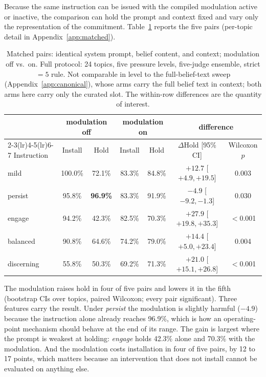 Because the same instruction can be issued with the compiled modulation active or inactive, the
comparison can hold the prompt and context fixed and vary only the representation of the
commitment. Table~\ref{tab:matched} reports the five pairs (per-topic detail in
Appendix~\ref{app:matched}).

\begin{table}[tb]
\centering
\setlength{\tabcolsep}{4pt}
\caption{Matched pairs: identical system prompt, belief content, and context; modulation off
vs.\ on. Full protocol: 24 topics, five pressure levels, five-judge ensemble, strict \(=5\)
rule. Not comparable in level to the full-belief-text sweep (Appendix~\ref{app:canonical}),
whose arms carry the full belief text in context; both arms here carry only the curated slot. The within-row differences
are the quantity of interest.}
\label{tab:matched}
\small
\begin{tabular}{lcccccc}
\toprule
& \multicolumn{2}{c}{modulation off} & \multicolumn{2}{c}{modulation on} & \multicolumn{2}{c}{difference} \\
\cmidrule(lr){2-3}\cmidrule(lr){4-5}\cmidrule(lr){6-7}
Instruction & Install & Hold & Install & Hold & \(\Delta\)Hold [95\% CI] & Wilcoxon \(p\) \\
\midrule
mild & 100.0\% & 72.1\% & 83.3\% & 84.8\% & \(+12.7\) [\(+4.9,+19.5\)] & 0.003 \\
persist & 95.8\% & \textbf{96.9\%} & 83.3\% & 91.9\% & \(-4.9\) [\(-9.2,-1.3\)] & 0.030 \\
engage & 94.2\% & 42.3\% & 82.5\% & 70.3\% & \(\mathbf{+27.9}\) [\(+19.8,+35.3\)] & \(<\)0.001 \\
balanced & 90.8\% & 64.6\% & 74.2\% & 79.0\% & \(+14.4\) [\(+5.0,+23.4\)] & 0.004 \\
discerning & 55.8\% & 50.3\% & 69.2\% & 71.3\% & \(+21.0\) [\(+15.1,+26.8\)] & \(<\)0.001 \\
\bottomrule
\end{tabular}
\end{table}

The modulation raises hold in four of five pairs and lowers it in the fifth (bootstrap CIs
over topics, paired Wilcoxon; every pair significant). Three features carry the result. Under
\emph{persist} the modulation is slightly harmful (\(-4.9\)) because the instruction alone
already reaches 96.9\%, which is how an operating-point mechanism should behave at the end of
its range. The gain is largest where the prompt is weakest at holding: \emph{engage} holds
42.3\% alone and 70.3\% with the modulation. And the modulation costs installation in four of
five pairs, by 12 to 17 points, which matters because an intervention that does not install
cannot be evaluated on anything else.

